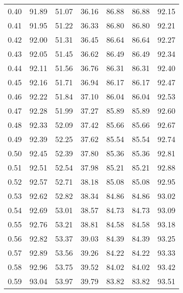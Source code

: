 \begin{tabular}{|c|c|c|c|c|c|c|}
      0.40 &     91.89 &     51.07 &      36.16 &   86.88 &      86.88 &         92.15 \\
      0.41 &     91.95 &     51.22 &      36.33 &   86.80 &      86.80 &         92.21 \\
      0.42 &     92.00 &     51.31 &      36.45 &   86.64 &      86.64 &         92.27 \\
      0.43 &     92.05 &     51.45 &      36.62 &   86.49 &      86.49 &         92.34 \\
      0.44 &     92.11 &     51.56 &      36.76 &   86.31 &      86.31 &         92.40 \\
      0.45 &     92.16 &     51.71 &      36.94 &   86.17 &      86.17 &         92.47 \\
      0.46 &     92.22 &     51.84 &      37.10 &   86.04 &      86.04 &         92.53 \\
      0.47 &     92.28 &     51.99 &      37.27 &   85.89 &      85.89 &         92.60 \\
      0.48 &     92.33 &     52.09 &      37.42 &   85.66 &      85.66 &         92.67 \\
      0.49 &     92.39 &     52.25 &      37.62 &   85.54 &      85.54 &         92.74 \\
      0.50 &     92.45 &     52.39 &      37.80 &   85.36 &      85.36 &         92.81 \\
      0.51 &     92.51 &     52.54 &      37.98 &   85.21 &      85.21 &         92.88 \\
      0.52 &     92.57 &     52.71 &      38.18 &   85.08 &      85.08 &         92.95 \\
      0.53 &     92.62 &     52.82 &      38.34 &   84.86 &      84.86 &         93.02 \\
      0.54 &     92.69 &     53.01 &      38.57 &   84.73 &      84.73 &         93.09 \\
      0.55 &     92.76 &     53.21 &      38.81 &   84.58 &      84.58 &         93.18 \\
      0.56 &     92.82 &     53.37 &      39.03 &   84.39 &      84.39 &         93.25 \\
      0.57 &     92.89 &     53.56 &      39.26 &   84.22 &      84.22 &         93.33 \\
      0.58 &     92.96 &     53.75 &      39.52 &   84.02 &      84.02 &         93.42 \\
      0.59 &     93.04 &     53.97 &      39.79 &   83.82 &      83.82 &         93.51 \\

\end{tabular}
